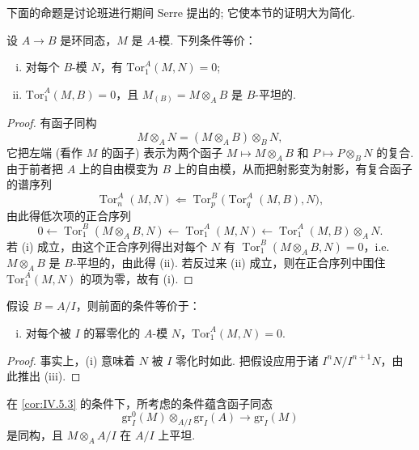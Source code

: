 下面的命题是讨论班进行期间 Serre 提出的; 它使本节的证明大为简化.

\begin{proposition}\label{prop:IV.5.2}
设 $A \to B$ 是环同态，$M$ 是 $A$-模. 下列条件等价：
\begin{enumerate}[(i)]
\item 对每个 $B$-模 $N$，有 $\mathrm{Tor}_{1}^{A}(M, N) = 0$; 
\item $\mathrm{Tor}_{1}^{A}(M, B) = 0$，且 $M_{(B)} = M \otimes_A B$ 是 $B$-平坦的.
\end{enumerate}
\end{proposition}

\begin{proof}
有函子同构
\[
M \otimes_A N = (M \otimes_A B) \otimes_B N,
\]
它把左端 (看作 $M$ 的函子) 表示为两个函子 $M \mapsto M \otimes_A B$ 和 $P \mapsto P \otimes_B N$ 的复合. 由于前者把 $A$ 上的自由模变为 $B$ 上的自由模，从而把射影变为射影，有复合函子的谱序列
\[
\operatorname{Tor}_{n}^{A}(M, N) \Longleftarrow \operatorname{Tor}_{p}^{B}\bigl(\operatorname{Tor}_{q}^{A}(M, B), N\bigr),
\]
由此得低次项的正合序列
\[
0 \longleftarrow \operatorname{Tor}_{1}^{B}(M \otimes_A B, N) \longleftarrow \operatorname{Tor}_{1}^{A}(M, N) \longleftarrow \operatorname{Tor}_{1}^{A}(M, B) \otimes_A N.
\]
若 (i) 成立，由这个正合序列得出对每个 $N$ 有 $\operatorname{Tor}_{1}^{B}(M \otimes_A B, N) = 0$，i.e. $M \otimes_A B$ 是 $B$-平坦的，由此得 (ii). 若反过来 (ii) 成立，则在正合序列中围住 $\mathrm{Tor}_{1}^{A}(M, N)$ 的项为零，故有 (i).
\end{proof}

\begin{corollary}\label{cor:IV.5.3}
假设 $B = A/I$，则前面的条件等价于：
\begin{enumerate}[(i)]
\item[((iii))] 对每个被 $I$ 的幂零化的 $A$-模 $N$，$\mathrm{Tor}_{1}^{A}(M, N) = 0$.
\end{enumerate}
\end{corollary}

\begin{proof}
事实上，(i) 意味着 $N$ 被 $I$ 零化时如此. 把假设应用于诸 $I^n N/I^{n+1}N$，由此推出 (iii).
\end{proof}

\begin{corollary}\label{cor:IV.5.4}
在 \ref{cor:IV.5.3} 的条件下，所考虑的条件蕴含函子同态
\begin{equation}
\mathrm{gr}_{I}^{0}(M) \otimes_{A/I} \mathrm{gr}_{I}(A) \longrightarrow \mathrm{gr}_{I}(M) \tag{($*$)}
\end{equation}
是同构，且 $M \otimes_A A/I$ 在 $A/I$ 上平坦.
\end{corollary}

